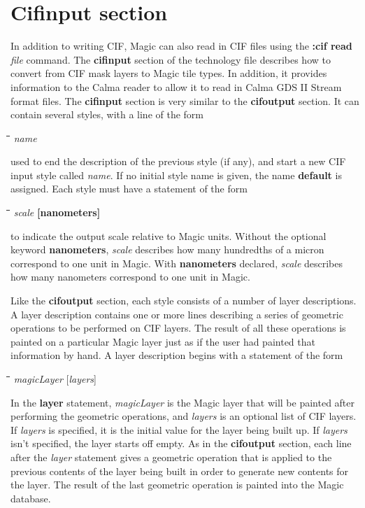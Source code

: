 \documentclass[letterpaper,twoside,12pt]{article}
\def\hinch{\hspace*{0.5in}}
\def\starti{\begin{center}\begin{tabbing}\hinch\=\hinch\=\hinch\=\hinch\=\kill}
\def\endi{\end{tabbing}\end{center}}
\def\ii{\>\>\>}
\begin{document}
\section{Cifinput section}

In addition to writing CIF, Magic can also read in CIF files using
the {\bfseries :cif read} {\itshape file} command.  The {\bfseries cifinput}
section of the technology file describes how to convert from CIF mask layers
to Magic tile types.
In addition, it provides information to the Calma reader to allow
it to read in Calma GDS II Stream format files.
The {\bfseries cifinput} section is very similar to the {\bfseries cifoutput}
section.  It can contain several styles, with a line of the form

\starti
   \ii {\bfseries style} {\itshape name}
\endi

used to end the description of the previous style (if any), and start a
new CIF input style called {\itshape name}.  If no initial style name is
given, the name {\bfseries default} is assigned.  Each style must have a
statement of the form

\starti
   \ii {\bfseries scalefactor} {\itshape scale} {\bfseries [nanometers]}
\endi

to indicate the output scale relative to Magic units.  Without the
optional keyword {\bfseries nanometers}, {\itshape scale} describes how
many hundredths of a micron correspond to one unit in Magic.  With
{\bfseries nanometers} declared, {\itshape scale} describes how many
nanometers correspond to one unit in Magic.

Like the {\bfseries cifoutput} section, each style consists of a number
of layer descriptions.  A layer description contains one
or more lines describing a series of geometric operations to be
performed on CIF layers.  The result of all these operations is
painted on a particular Magic layer just as if the user had
painted that information by hand.
A layer description begins with a statement of the form

\starti
   \ii {\bfseries layer} {\itshape magicLayer }[{\itshape layers}]
\endi

In the {\bfseries layer} statement, {\itshape magicLayer} is the Magic layer
that will be painted after performing the geometric operations,
and {\itshape layers} is an optional list of CIF layers.  If
{\itshape layers} is specified, it is the initial value for the layer
being built up.  If {\itshape layers} isn't specified, the layer starts
off empty.  As in the {\bfseries cifoutput} section, each line after
the {\itshape layer} statement gives a geometric operation that is applied
to the previous contents of the layer being built in order to generate
new contents for the layer.  The result of the last geometric operation
is painted into the Magic database.
\end{document}
